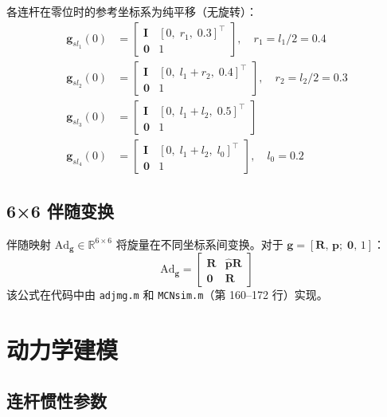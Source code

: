 \documentclass[12pt,a4paper]{ctexart}
\begin{document}
\begin{stepbox}
各连杆在零位时的参考坐标系为纯平移（无旋转）：
\begin{align*}
\mathbf{g}_{sl_1}(0) &= \begin{bmatrix} \mathbf{I} & [0,\; r_1,\; 0.3]^\top \\ \mathbf{0} & 1 \end{bmatrix}, \quad r_1 = l_1/2 = 0.4 \\[3pt]
\mathbf{g}_{sl_2}(0) &= \begin{bmatrix} \mathbf{I} & [0,\; l_1+r_2,\; 0.4]^\top \\ \mathbf{0} & 1 \end{bmatrix}, \quad r_2 = l_2/2 = 0.3 \\[3pt]
\mathbf{g}_{sl_3}(0) &= \begin{bmatrix} \mathbf{I} & [0,\; l_1+l_2,\; 0.5]^\top \\ \mathbf{0} & 1 \end{bmatrix} \\[3pt]
\mathbf{g}_{sl_4}(0) &= \begin{bmatrix} \mathbf{I} & [0,\; l_1+l_2,\; l_0]^\top \\ \mathbf{0} & 1 \end{bmatrix}, \quad l_0 = 0.2
\end{align*}
\end{stepbox}

\subsection{6×6 伴随变换}

伴随映射 $\mathrm{Ad}_{\mathbf{g}} \in \mathbb{R}^{6\times 6}$ 将旋量在不同坐标系间变换。对于 $\mathbf{g}=[\mathbf{R},\,\mathbf{p};\;\mathbf{0},\,1]$：
\[
\mathrm{Ad}_{\mathbf{g}} = \begin{bmatrix}
\mathbf{R} & \hat{\mathbf{p}}\mathbf{R} \\
\mathbf{0} & \mathbf{R}
\end{bmatrix}
\]
该公式在代码中由 \texttt{adjmg.m} 和 \texttt{MCNsim.m}（第 160--172 行）实现。

\section{动力学建模}

\subsection{连杆惯性参数}
\end{document}
